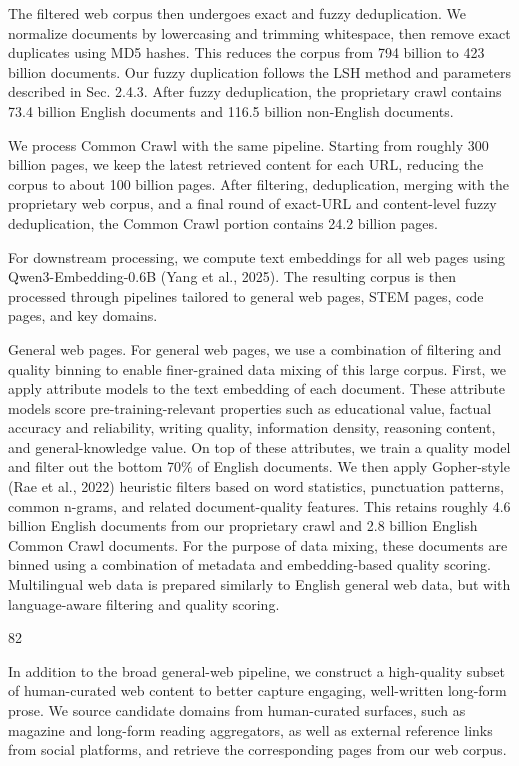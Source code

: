 \documentclass[
  10
]{article}
\begin{document}
The filtered web corpus then undergoes exact and fuzzy deduplication. We
normalize documents by lowercasing and trimming whitespace, then remove
exact duplicates using MD5 hashes. This reduces the corpus from 794
billion to 423 billion documents. Our fuzzy duplication follows the LSH
method and parameters described in Sec. 2.4.3. After fuzzy
deduplication, the proprietary crawl contains 73.4 billion English
documents and 116.5 billion non-English documents.

We process Common Crawl with the same pipeline. Starting from roughly
300 billion pages, we keep the latest retrieved content for each URL,
reducing the corpus to about 100 billion pages. After filtering,
deduplication, merging with the proprietary web corpus, and a final
round of exact-URL and content-level fuzzy deduplication, the Common
Crawl portion contains 24.2 billion pages.

For downstream processing, we compute text embeddings for all web pages
using Qwen3-Embedding-0.6B (Yang et al., 2025). The resulting corpus is
then processed through pipelines tailored to general web pages, STEM
pages, code pages, and key domains.

General web pages. For general web pages, we use a combination of
filtering and quality binning to enable finer-grained data mixing of
this large corpus. First, we apply attribute models to the text
embedding of each document. These attribute models score
pre-training-relevant properties such as educational value, factual
accuracy and reliability, writing quality, information density,
reasoning content, and general-knowledge value. On top of these
attributes, we train a quality model and filter out the bottom 70\% of
English documents. We then apply Gopher-style (Rae et al., 2022)
heuristic filters based on word statistics, punctuation patterns, common
n-grams, and related document-quality features. This retains roughly 4.6
billion English documents from our proprietary crawl and 2.8 billion
English Common Crawl documents. For the purpose of data mixing, these
documents are binned using a combination of metadata and embedding-based
quality scoring. Multilingual web data is prepared similarly to English
general web data, but with language-aware filtering and quality scoring.

82

In addition to the broad general-web pipeline, we construct a
high-quality subset of human-curated web content to better capture
engaging, well-written long-form prose. We source candidate domains from
human-curated surfaces, such as magazine and long-form reading
aggregators, as well as external reference links from social platforms,
and retrieve the corresponding pages from our web corpus.
\end{document}
